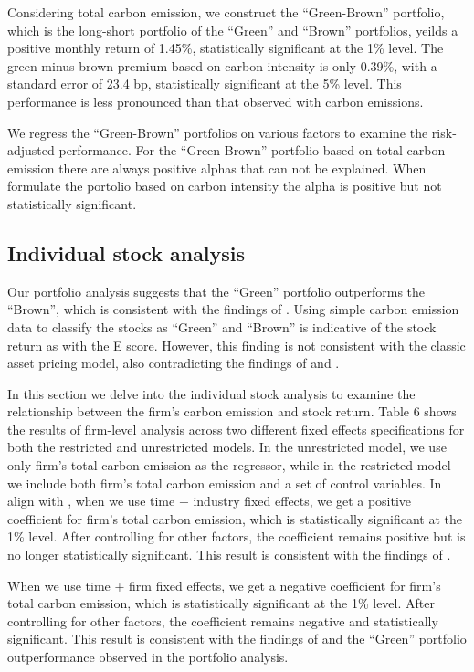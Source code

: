 \documentclass[12pt]{article}
\begin{document}
Considering total carbon emission, we construct the ``Green-Brown'' portfolio, which is the long-short portfolio of the ``Green'' and ``Brown'' portfolios, yeilds a positive monthly return of 1.45\%, statistically significant at the 1\% level. The green minus brown premium based on carbon intensity is only 0.39\%, with a standard error of 23.4 bp, statistically significant at the 5\% level. This performance is less pronounced than that observed with carbon emissions.

We regress the ``Green-Brown'' portfolios on various factors to examine the risk-adjusted performance. For the ``Green-Brown'' portfolio based on total carbon emission there are always positive alphas that can not be explained. When formulate the portolio based on carbon intensity the alpha is positive but not statistically significant.

\subsection{Individual stock analysis}
Our portfolio analysis suggests that the ``Green'' portfolio outperforms the ``Brown'', which is consistent with the findings of \cite{pastor2022dissecting}. Using simple carbon emission data to classify the stocks as ``Green'' and ``Brown'' is indicative of the stock return as with the E score. However, this finding is not consistent with the classic asset pricing model, also contradicting the findings of \cite{bolton2021investors} and \cite{aswani2023carbon}. 

In this section we delve into the individual stock analysis to examine the relationship between the firm's carbon emission and stock return. Table 6 shows the results of firm-level analysis across two different fixed effects specifications for both the restricted and unrestricted models. In the unrestricted model, we use only firm's total carbon emission as the regressor, while in the restricted model we include both firm's total carbon emission and a set of control variables. In align with \cite{bolton2021investors}, when we use time + industry fixed effects, we get a positive coefficient for firm's total carbon emission, which is statistically significant at the 1\% level. After controlling for other factors, the coefficient remains positive but is no longer statistically significant. This result is consistent with the findings of \cite{aswani2023carbon}.

When we use time + firm fixed effects, we get a negative coefficient for firm's total carbon emission, which is statistically significant at the 1\% level. After controlling for other factors, the coefficient remains negative and statistically significant. This result is consistent with the findings of \cite{pastor2022dissecting} and the ``Green'' portfolio outperformance observed in the portfolio analysis.
\end{document}
